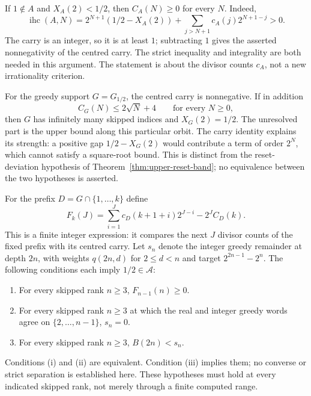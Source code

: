 \begin{thm}
\label{thm:mobius-centred-nonneg}
If $1\notin A$ and $X_A(2)<1/2$, then $C_A(N)\ge0$ for every $N$.
Indeed,
\[
 \operatorname{ihc}(A,N)=2^{N+1}(1/2-X_A(2))+
 \sum_{j>N+1}c_A(j)2^{N+1-j}>0.
\]
The carry is an integer, so it is at least $1$; subtracting $1$ gives
the asserted nonnegativity of the centred carry.  The strict inequality
and integrality are both needed in this argument.  The statement is
about the divisor counts $c_A$, not a new irrationality criterion.
\end{thm}

\begin{thm}
\label{thm:sqrt-bound-route}
For the greedy support $G=G_{1/2}$, the centred carry is nonnegative.
If in addition
\[
 C_G(N)\le2\sqrt N+4\qquad\text{for every }N\ge0,
\]
then $G$ has infinitely many skipped indices and $X_G(2)=1/2$.
The unresolved part is the upper bound along this particular orbit.
The carry identity explains its strength: a positive gap
$1/2-X_G(2)$ would contribute a term of order $2^N$, which cannot satisfy
a square-root bound.  This is distinct from the reset-deviation
hypothesis of Theorem~\ref{thm:upper-reset-band}; no equivalence between
the two hypotheses is asserted.
\end{thm}

\begin{thm}
\label{thm:frozen-margin}
For the prefix $D=G\cap\{1,\ldots,k\}$ define
\[
 F_k(J)=\sum_{i=1}^{J}c_D(k+1+i)2^{J-i}-2^J C_D(k).
\]
This is a finite integer expression: it compares the next $J$ divisor
counts of the fixed prefix with its centred carry.  Let $s_n$ denote the
integer greedy remainder at depth $2n$, with weights $q(2n,d)$ for
$2\le d<n$ and target $2^{2n-1}-2^n$.
The following conditions each imply $1/2\in\mathcal A$:
\begin{enumerate}[label=(\roman*)]
\item For every skipped rank $n\ge3$, $F_{n-1}(n)\ge0$.
\item For every skipped rank $n\ge3$ at which the real and integer
      greedy words agree on $\{2,\ldots,n-1\}$, $s_n=0$.
\item For every skipped rank $n\ge3$, $B(2n)<s_n$.
\end{enumerate}
Conditions (i) and (ii) are equivalent.  Condition (iii) implies them;
no converse or strict separation is established here.  These hypotheses
must hold at every indicated skipped rank, not merely through a finite
computed range.
\end{thm}

